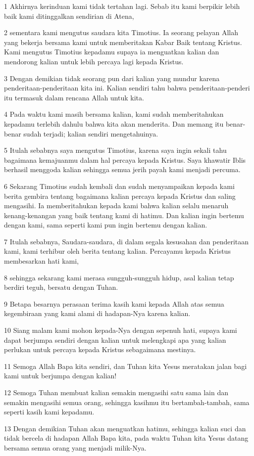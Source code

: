 \par 1 Akhirnya kerinduan kami tidak tertahan lagi. Sebab itu kami berpikir lebih baik kami ditinggalkan sendirian di Atena,
\par 2 sementara kami mengutus saudara kita Timotius. Ia seorang pelayan Allah yang bekerja bersama kami untuk memberitakan Kabar Baik tentang Kristus. Kami mengutus Timotius kepadamu supaya ia menguatkan kalian dan mendorong kalian untuk lebih percaya lagi kepada Kristus.
\par 3 Dengan demikian tidak seorang pun dari kalian yang mundur karena penderitaan-penderitaan kita ini. Kalian sendiri tahu bahwa penderitaan-penderi itu termasuk dalam rencana Allah untuk kita.
\par 4 Pada waktu kami masih bersama kalian, kami sudah memberitahukan kepadamu terlebih dahulu bahwa kita akan menderita. Dan memang itu benar-benar sudah terjadi; kalian sendiri mengetahuinya.
\par 5 Itulah sebabnya saya mengutus Timotius, karena saya ingin sekali tahu bagaimana kemajuanmu dalam hal percaya kepada Kristus. Saya khawatir Iblis berhasil menggoda kalian sehingga semua jerih payah kami menjadi percuma.
\par 6 Sekarang Timotius sudah kembali dan sudah menyampaikan kepada kami berita gembira tentang bagaimana kalian percaya kepada Kristus dan saling mengasihi. Ia memberitahukan kepada kami bahwa kalian selalu menaruh kenang-kenangan yang baik tentang kami di hatimu. Dan kalian ingin bertemu dengan kami, sama seperti kami pun ingin bertemu dengan kalian.
\par 7 Itulah sebabnya, Saudara-saudara, di dalam segala kesusahan dan penderitaan kami, kami terhibur oleh berita tentang kalian. Percayamu kepada Kristus membesarkan hati kami,
\par 8 sehingga sekarang kami merasa sungguh-sungguh hidup, asal kalian tetap berdiri teguh, bersatu dengan Tuhan.
\par 9 Betapa besarnya perasaan terima kasih kami kepada Allah atas semua kegembiraan yang kami alami di hadapan-Nya karena kalian.
\par 10 Siang malam kami mohon kepada-Nya dengan sepenuh hati, supaya kami dapat berjumpa sendiri dengan kalian untuk melengkapi apa yang kalian perlukan untuk percaya kepada Kristus sebagaimana mestinya.
\par 11 Semoga Allah Bapa kita sendiri, dan Tuhan kita Yesus meratakan jalan bagi kami untuk berjumpa dengan kalian!
\par 12 Semoga Tuhan membuat kalian semakin mengasihi satu sama lain dan semakin mengasihi semua orang, sehingga kasihmu itu bertambah-tambah, sama seperti kasih kami kepadamu.
\par 13 Dengan demikian Tuhan akan menguatkan hatimu, sehingga kalian suci dan tidak bercela di hadapan Allah Bapa kita, pada waktu Tuhan kita Yesus datang bersama semua orang yang menjadi milik-Nya.

